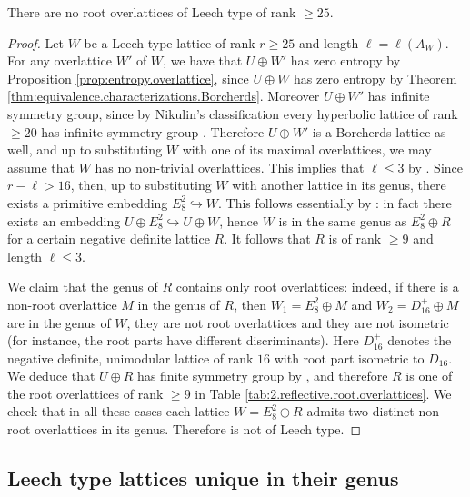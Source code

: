 \documentclass[11pt,letterpaper]{amsart}
\begin{document}
\begin{proposition} \label{prop:no.leech.rank.25}
There are no root overlattices of Leech type of rank $\ge 25$.
\end{proposition}
\begin{proof}
Let $W$ be a Leech type lattice of rank $r\ge 25$ and length $\ell=\ell(A_W)$. For any overlattice $W'$ of $W$, we have that $U\oplus W'$ has zero entropy by Proposition \ref{prop:entropy.overlattice}, since $U\oplus W$ has zero entropy by Theorem \ref{thm:equivalence.characterizations.Borcherds}. Moreover $U\oplus W'$ has infinite symmetry group, since by Nikulin's classification every hyperbolic lattice of rank $\ge 20$ has infinite symmetry group \cite{nikulin.finite.aut.greater.5}. Therefore $U\oplus W'$ is a Borcherds lattice as well, and up to substituting $W$ with one of its maximal overlattices, we may assume that $W$ has no non-trivial overlattices.
This implies that $\ell \le 3$ by \cite[Lemma~3.5.3]{kirschmer}. Since $r-\ell > 16$, then, up to substituting $W$ with another lattice in its genus, there exists a primitive embedding $E_8^2 \hookrightarrow W$. This follows essentially by \cite[Corollary~1.13.5]{nikulin.integral.symmetric.bilinear}: in fact there exists an embedding $U\oplus E_8^2 \hookrightarrow U\oplus W$, hence $W$ is in the same genus as $E_8^2\oplus R$ for a certain negative definite lattice $R$. It follows that $R$ is of rank $\ge 9$ and length $\ell\le 3$.

We claim that the genus of $R$ contains only root overlattices: indeed, if there is a non-root overlattice $M$ in the genus of $R$, then $W_1=E_8^2\oplus M$ and $W_2=D_{16}^+\oplus M$ are in the genus of $W$, they are not root overlattices and they are not isometric (for instance, the root parts have different discriminants). Here $D_{16}^+$ denotes the negative definite, unimodular lattice of rank $16$ with root part isometric to $D_{16}$. We deduce that $U\oplus R$ has finite symmetry group by \cite[Theorems~3.1.1~and~4.1.1]{nikulin.factor.groups}, and therefore $R$ is one of the root overlattices of rank $\ge 9$ in Table \ref{tab:2.reflective.root.overlattices}. We check that in all these cases each lattice $W=E_8^2\oplus R$  admits two distinct non-root overlattices in its genus.
Therefore is not of Leech type.
\end{proof}

\subsection{Leech type lattices unique in their genus} \label{sec:Leech.lattices.unique.genus}
\end{document}

